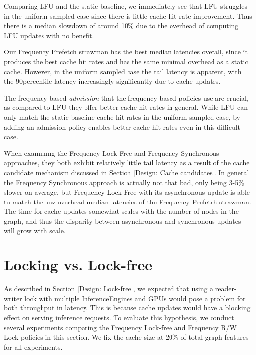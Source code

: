 Comparing LFU and the static baseline, we immediately see that LFU struggles in the uniform sampled case since there is little cache hit rate improvement. Thus there is a median slowdown of around 10\% due to the overhead of computing LFU updates with no benefit. 

Our Frequency Prefetch strawman has the best median latencies overall, since it produces the best cache hit rates and has the same minimal overhead as a static cache. However, in the uniform sampled case the tail latency is apparent, with the 90\th percentile latency increasingly significantly due to cache updates.

The frequency-based \textit{admission} that the frequency-based policies use are crucial, as compared to LFU they offer better cache hit rates in general. While LFU can only match the static baseline cache hit rates in the uniform sampled case, by adding an admission policy enables better cache hit rates even in this difficult case. 

When examining the Frequency Lock-Free and Frequency Synchronous approaches, they both exhibit relatively little tail latency as a result of the cache candidate mechanism discussed in Section \ref{Design: Cache candidates}. In general the Frequency Synchronous approach is actually not that bad, only being 3-5\% slower on average, but Frequency Lock-Free with its asynchronous update is able to match the low-overhead median latencies of the Frequency Prefetch strawman. The time for cache updates somewhat scales with the number of nodes in the graph, and thus the disparity between asynchronous and synchronous updates will grow with scale.

\section{Locking vs. Lock-free}

As described in Section \ref{Design: Lock-free}, we expected that using a reader-writer lock with multiple InferenceEngines and GPUs would pose a problem for both throughput in latency. This is because cache updates would have a blocking effect on serving inference requests. To evaluate this hypothesis, we conduct several experiments comparing the Frequency Lock-free and Frequency R/W Lock policies in this section. We fix the cache size at 20\% of total graph features for all experiments.

